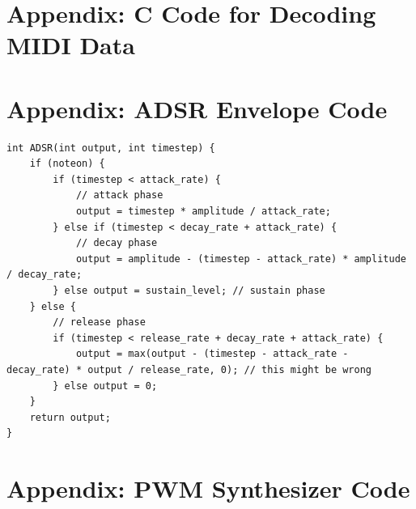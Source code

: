 \documentclass[12pt]{article}
\begin{document}
\section{Appendix: C Code for Decoding MIDI Data}\label{sec:appendix-b:-c-code-for-decoding-midi-data}


\section{Appendix: ADSR Envelope Code}\label{sec:appendix-c:-adsr-envelope-code}

\begin{lstlisting}
int ADSR(int output, int timestep) {
    if (noteon) {
        if (timestep < attack_rate) {
            // attack phase
            output = timestep * amplitude / attack_rate;
        } else if (timestep < decay_rate + attack_rate) {
            // decay phase
            output = amplitude - (timestep - attack_rate) * amplitude / decay_rate;
        } else output = sustain_level; // sustain phase
    } else {
        // release phase
        if (timestep < release_rate + decay_rate + attack_rate) {
            output = max(output - (timestep - attack_rate - decay_rate) * output / release_rate, 0); // this might be wrong
        } else output = 0;
    }
    return output;
}
\end{lstlisting}

\section{Appendix: PWM Synthesizer Code}\label{sec:appendix-d:-pwm-synthesizer-code}
\end{document}
